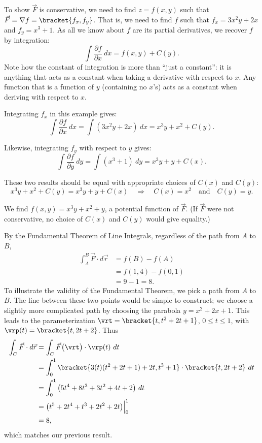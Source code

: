 {To show $\vec F$ is conservative, we need to find $z = f(x,y)$ such that $\vec F = \nabla f =\bracket{f_x, f_y}$. That is, we need to find $f$ such that $f_x = 3x^2y+2x$ and $f_y = x^3+1$. As all we know about $f$ are its partial derivatives, we recover $f$ by integration:
\[\int \frac{\partial f}{\partial x}\ dx = f(x,y) + C(y).\]
Note how the constant of integration is more than ``just a constant'': it is anything that acts as a constant when taking a derivative with respect to $x$. Any function that is a function of $y$ (containing no $x$'s) acts as a constant when deriving with respect to $x$.

Integrating $f_x$ in this example gives:
\[\int \frac{\partial f}{\partial x}\ dx = \int (3x^2y+2x)\ dx = x^3y+x^2 + C(y).\]

Likewise, integrating $f_y$ with respect to $y$ gives:
\[\int \frac{\partial f}{\partial y}\ dy = \int( x^3+1)\ dy = x^3y+ y + C(x).\]

These two results should be equal with appropriate choices of $C(x)$ and $C(y)$:
\[
x^3y+x^2 + C(y) = x^3y+ y + C(x)
\quad \Rightarrow\quad
C(x) = x^2 \quad \text{and}\quad C(y) = y.
\]

We find $f(x,y) = x^3y+x^2+y$, a potential function of $\vec F$. (If $\vec F$ were not conservative, no choice of $C(x)$ and $C(y)$ would give equality.)

By the Fundamental Theorem of Line Integrals, regardless of the path from $A$ to $B$, 
\begin{align*}
	\int_A^B\vec F\cdot d\vec r
	&= f(B) - f(A) \\
	&= f(1,4) - f(0,1) \\
	&= 9 - 1 = 8.
\end{align*}
To illustrate the validity of the Fundamental Theorem, we pick a path from $A$ to $B$. The line between these two points would be simple to construct; we choose a slightly more complicated path by choosing the parabola $y = x^2+2x+1$. This leads to the parameterization $\vrt =\bracket{t, t^2+2t+1}$, $0\leq t\leq 1$, with $\vrp(t) =\bracket{t, 2t+2}$. Thus
\begin{align*}
	\int_C \vec F\cdot d\vec r &= \int_C\vec F\big(\vrt\big)\cdot\vrp(t)\ dt\\
	&= \int_0^1\bracket{3(t)(t^2+2t+1)+2t, t^3+1}\cdot\bracket{t,2t+2}\ dt\\
	&= \int_0^1 \big(5t^4+8t^3+3t^2+4t+2\big)\ dt\\
	&= \big(t^5+2t^4+t^3+2t^2+2t\big)\Big|_0^1\\
	&= 8,
\end{align*}				
which matches our previous result.}

